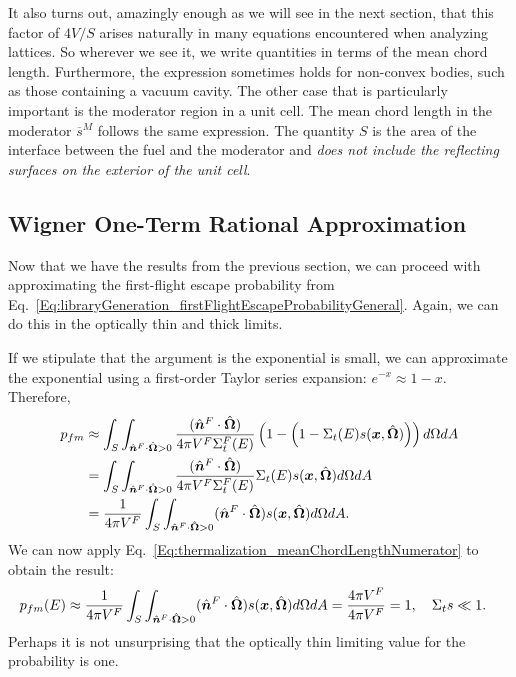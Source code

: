 It also turns out, amazingly enough as we will see in the next section, that this factor of $4V/S$ arises naturally in many equations encountered when analyzing lattices. So wherever we see it, we write quantities in terms of the mean chord length. Furthermore, the expression sometimes holds for non-convex bodies, such as those containing a vacuum cavity. The other case that is particularly important is the moderator region in a unit cell. The mean chord length in the moderator $\overline{s}^M$ follows the same expression. The quantity $S$ is the area of the interface between the fuel and the moderator and \emph{does not include the reflecting surfaces on the exterior of the unit cell}.




\subsection{Wigner One-Term Rational Approximation}

Now that we have the results from the previous section, we can proceed with approximating the first-flight escape probability from Eq.~\eqref{Eq:libraryGeneration_firstFlightEscapeProbabilityGeneral}. Again, we can do this in the optically thin and thick limits.

If we stipulate that the argument is the exponential is small, we can approximate the exponential using a first-order Taylor series expansion: $e^{-x} \approx 1 - x$. Therefore,
\begin{align}
  p_{fm} 
  &\approx \int_{S} \int_{\hat{\bm{n}}^F \cdot \hat{\mathbf{\Omega}} > 0} \frac{( \hat{\bm{n}}^F \cdot \hat{\mathbf{\Omega}} )}{4\pi V^F \Sigma_t^F(E)} \left( 1 - \left( 1 - \Sigma_t(E) s(\bm{x},\hat{\mathbf{\Omega}}) \right) \right) d\Omega dA \nonumber \\
  &= \int_{S} \int_{\hat{\bm{n}}^F \cdot \hat{\mathbf{\Omega}} > 0}  \frac{( \hat{\bm{n}}^F \cdot \hat{\mathbf{\Omega}} )}{4\pi V^F \Sigma_t^F(E)} \Sigma_t(E) s(\bm{x},\hat{\mathbf{\Omega}})  d\Omega dA \nonumber \\
  &= \frac{1}{ 4\pi V^F } \int_{S} \int_{\hat{\bm{n}}^F \cdot \hat{\mathbf{\Omega}} > 0}  ( \hat{\bm{n}}^F \cdot \hat{\mathbf{\Omega}} ) s(\bm{x},\hat{\mathbf{\Omega}})  d\Omega dA . \nonumber 
\end{align}
We can now apply Eq.~\eqref{Eq:thermalization_meanChordLengthNumerator} to obtain the result:
\begin{align}
  p_{fm}(E) 
  &\approx  \frac{1}{ 4\pi V^F } \int_{S} \int_{\hat{\bm{n}}^F \cdot \hat{\mathbf{\Omega}} > 0}  ( \hat{\bm{n}}^F \cdot \hat{\mathbf{\Omega}} ) s(\bm{x},\hat{\mathbf{\Omega}})  d\Omega dA = \frac{ 4\pi V^F }{ 4\pi V^F } = 1, \quad \Sigma_t s \ll 1.
\end{align}
Perhaps it is not unsurprising that the optically thin limiting value for the probability is one.

